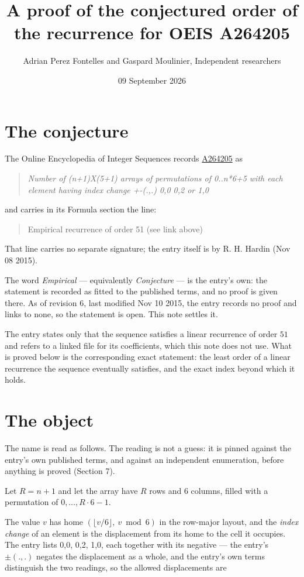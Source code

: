 \documentclass[11pt]{article}
\title{A proof of the conjectured order of the recurrence for OEIS A264205}
\author{Adrian Perez Fontelles and Gaspard Moulinier, Independent researchers}
\date{09 September 2026}
\theoremstyle{definition}
\begin{document}
\maketitle
\section{The conjecture}

The Online Encyclopedia of Integer Sequences records \href{https://oeis.org/A264205}{A264205} as

\begin{quote}\itshape Number of (n+1)X(5+1) arrays of permutations of 0..n*6+5 with each element having index change +-(.,.) 0,0 0,2 or 1,0\end{quote}

and carries in its Formula section the line:

\begin{quote}\ttfamily Empirical recurrence of order 51 (see link above)\end{quote}

That line carries no separate signature; the entry itself is by R. H. Hardin (Nov 08 2015).

The word {\itshape Empirical} --- equivalently {\itshape Conjecture} --- is the entry's own: the statement is recorded as fitted to the published terms, and no proof is given there. As of revision 6, last modified Nov 10 2015, the entry records no proof and links to none, so the statement is open. This note settles it.

The entry states only that the sequence satisfies a linear recurrence of order $51$ and refers to a linked file for its coefficients, which this note does not use. What is proved below is the corresponding exact statement: the least order of a linear recurrence the sequence eventually satisfies, and the exact index beyond which it holds.

\section{The object}

The name is read as follows. The reading is not a guess: it is pinned against the entry's own published terms, and against an independent enumeration, before anything is proved (Section 7).

Let $R = n + 1$ and let the array have $R$ rows and $6$ columns, filled with a permutation of $0,\dots,R\cdot6-1$.

The value $v$ has home $(\lfloor v/6\rfloor,\ v \bmod 6)$ in the row-major layout, and the {\itshape index change} of an element is the displacement from its home to the cell it occupies. The entry lists 0,0, 0,2, 1,0, each together with its negative --- the entry's $\pm(.,.)$ negates the displacement as a whole, and the entry's own terms distinguish the two readings, so the allowed displacements are
\end{document}
